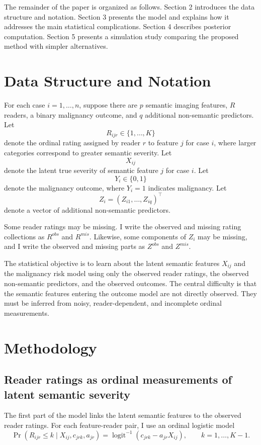 \documentclass[twoside,11pt]{article}
\begin{document}
The remainder of the paper is organized as follows. Section 2 introduces the data structure and notation. Section 3 presents the model and explains how it addresses the main statistical complications. Section 4 describes posterior computation. Section 5 presents a simulation study comparing the proposed method with simpler alternatives.

\section{Data Structure and Notation}

For each case $i=1,\dots,n$, suppose there are $p$ semantic imaging features, $R$ readers, a binary malignancy outcome, and $q$ additional non-semantic predictors. Let
\[
R_{ijr} \in \{1,\dots,K\}
\]
denote the ordinal rating assigned by reader $r$ to feature $j$ for case $i$, where larger categories correspond to greater semantic severity. Let
\[
X_{ij}
\]
denote the latent true severity of semantic feature $j$ for case $i$. Let
\[
Y_i \in \{0,1\}
\]
denote the malignancy outcome, where $Y_i=1$ indicates malignancy. Let
\[
Z_i = (Z_{i1},\dots,Z_{iq})^\top
\]
denote a vector of additional non-semantic predictors.

Some reader ratings may be missing. I write the observed and missing rating collections as $R^{obs}$ and $R^{mis}$. Likewise, some components of $Z_i$ may be missing, and I write the observed and missing parts as $Z^{obs}$ and $Z^{mis}$.

The statistical objective is to learn about the latent semantic features $X_{ij}$ and the malignancy risk model using only the observed reader ratings, the observed non-semantic predictors, and the observed outcomes. The central difficulty is that the semantic features entering the outcome model are not directly observed. They must be inferred from noisy, reader-dependent, and incomplete ordinal measurements.

\section{Methodology}

\subsection{Reader ratings as ordinal measurements of latent semantic severity}

The first part of the model links the latent semantic features to the observed reader ratings. For each feature-reader pair, I use an ordinal logistic model
\[
\Pr(R_{ijr} \le k \mid X_{ij}, c_{jrk}, a_{jr})
=
\operatorname{logit}^{-1}(c_{jrk} - a_{jr}X_{ij}),
\qquad k=1,\dots,K-1.
\]
\end{document}
